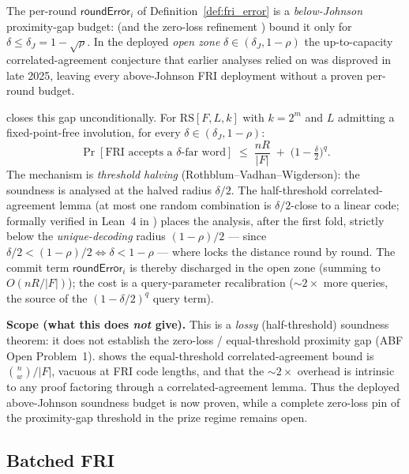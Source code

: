 \begin{remark}\label{rem:fri_threshold_halving}
    The per-round $\mathsf{roundError}_i$ of Definition~\ref{def:fri_error} is a
    \emph{below-Johnson} proximity-gap budget: \cite{BCIKS20} (and the zero-loss refinement
    \cite{BCHKS25}) bound it only for $\delta \le \delta_J = 1-\sqrt{\rho}$.  In the deployed
    \emph{open zone} $\delta \in (\delta_J, 1-\rho)$ the up-to-capacity correlated-agreement
    conjecture that earlier analyses relied on was disproved in late 2025, leaving every
    above-Johnson FRI deployment without a proven per-round budget.

    \cite{ChaiFan26} closes this gap unconditionally.  For $\mathrm{RS}[F,L,k]$ with $k=2^m$ and
    $L$ admitting a fixed-point-free involution, for every $\delta \in (\delta_J, 1-\rho)$:
    \[ \Pr[\text{FRI accepts a $\delta$-far word}] \;\le\; \frac{nR}{|F|} \;+\; \bigl(1-\tfrac{\delta}{2}\bigr)^{q}. \]
    The mechanism is \emph{threshold halving} (Rothblum--Vadhan--Wigderson): the soundness is
    analysed at the halved radius $\delta/2$.  The half-threshold correlated-agreement lemma
    (at most one random combination is $\delta/2$-close to a linear code; formally verified in
    Lean~4 in \cite{ChaiFan26}) places the analysis, after the first fold, strictly below the
    \emph{unique-decoding} radius $(1-\rho)/2$ --- since $\delta/2 < (1-\rho)/2 \iff \delta < 1-\rho$
    --- where \cite{BCIKS20} locks the distance round by round.  The commit term $\mathsf{roundError}_i$
    is thereby discharged in the open zone (summing to $O(nR/|F|)$); the cost is a query-parameter
    recalibration ($\sim 2\times$ more queries, the source of the $(1-\delta/2)^q$ query term).

    \textbf{Scope (what this does \emph{not} give).}  This is a \emph{lossy} (half-threshold)
    soundness theorem: it does not establish the zero-loss / equal-threshold proximity gap (ABF
    Open Problem~1).  \cite{ChaiFan26} shows the equal-threshold correlated-agreement bound is
    $\binom{n}{w}/|F|$, vacuous at FRI code lengths, and that the $\sim2\times$ overhead is intrinsic
    to any proof factoring through a correlated-agreement lemma.  Thus the deployed above-Johnson
    soundness budget is now proven, while a complete zero-loss pin of the proximity-gap threshold
    in the prize regime remains open.
\end{remark}

\subsection{Batched FRI}\label{sec:batched_fri}

